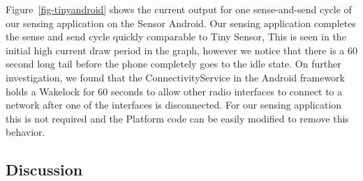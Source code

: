 Figure~\ref{fig-tinyandroid} shows the current output for one sense-and-send cycle of our 
sensing application on the Sensor Android. Our sensing application completes the sense and 
send cycle quickly comparable to Tiny Sensor, This is seen in the initial high current draw period 
in the graph, however we notice that there is a 60 second long tail before
the phone completely goes to the idle state. On further investigation, we found that the 
ConnectivityService in the Android framework holds a Wakelock for 60 seconds to allow other 
radio interfaces to connect  to a network after one of the interfaces is disconnected. 
For our sensing application this is not required and the Platform code can be easily modified to remove this behavior.



\subsection{Discussion}



